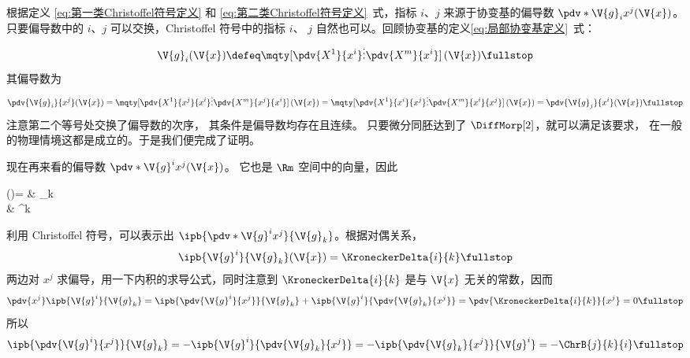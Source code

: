 \begin{myProof}
根据定义 \eqref{eq:第一类Christoffel符号定义} 和
\eqref{eq:第二类Christoffel符号定义}~式，指标 $i$、$j$
来源于协变基的偏导数 $\pdv*{\V{g}_i}{x^j} (\V{x})$。
只要偏导数中的 $i$、$j$ 可以交换，Christoffel 符号中的指标 $i$、
$j$ 自然也可以。回顾协变基的定义\eqref{eq:局部协变基定义}~式：
\begin{equation}
	\V{g}_i (\V{x})
	\defeq\mqty[\displaystyle\pdv{X^1}{x^i} \\[1ex]
		\vdots \\[0.7ex] \displaystyle\pdv{X^m}{x^i}]\,(\V{x})
	\fullstop
\end{equation}
其偏导数为
\begin{equation}
	\pdv{\V{g}_i}{x^j} (\V{x})
	=\mqty[\displaystyle\pdv{X^1}{x^j}{x^i} \\[1ex]
		\vdots \\[0.7ex] \displaystyle\pdv{X^m}{x^j}{x^i}]\,(\V{x})
	=\mqty[\displaystyle\pdv{X^1}{x^i}{x^j} \\[1ex]
		\vdots \\[0.7ex] \displaystyle\pdv{X^m}{x^i}{x^j}]\,(\V{x})
	=\pdv{\V{g}_j}{x^i} (\V{x}) \fullstop
\end{equation}
注意第二个等号处交换了偏导数的次序，
其条件是偏导数均存在且连续。
只要微分同胚达到了 $\DiffMorp[2]$，就可以满足该要求，
在一般的物理情境这都是成立的。于是我们便完成了证明。
\end{myProof}

现在再来看的偏导数 $\pdv*{\V{g}^i}{x^j} (\V{x})$。
它也是 $\Rm$ 空间中的向量，因此
\begin{braceEq*}
	{\label{eq:逆变基偏导数的协变与逆变表示}  ()=}
	& _k \comma \\
	& ^k \fullstop
\end{braceEq*}
利用 Christoffel 符号，可以表示出
$\ipb{\pdv*{\V{g}^i}{x^j}}{\V{g}_k}$。根据对偶关系，
\begin{equation}
	\ipb{\V{g}^i}{\V{g}_k} (\V{x})=\KroneckerDelta{i}{k} \fullstop
\end{equation}
两边对 $x^j$ 求偏导，用一下内积的求导公式，同时注意到
$\KroneckerDelta{i}{k}$ 是与 $\V{x}$ 无关的常数，因而
\begin{equation}
	\pdv{x^j} \ipb{\V{g}^i}{\V{g}_k}
	=\ipb{\pdv{\V{g}^i}{x^j}}{\V{g}_k}
		+\ipb{\V{g}^i}{\pdv{\V{g}_k}{x^j}}
	=\pdv{\KroneckerDelta{i}{k}}{x^j}=0 \fullstop
\end{equation}
所以
\begin{equation}
	\ipb{\pdv{\V{g}^i}{x^j}}{\V{g}_k}
	=-\ipb{\V{g}^i}{\pdv{\V{g}_k}{x^j}}
	=-\ipb{\pdv{\V{g}_k}{x^j}}{\V{g}^i}
	=-\ChrB{j}{k}{i} \fullstop
\end{equation}

